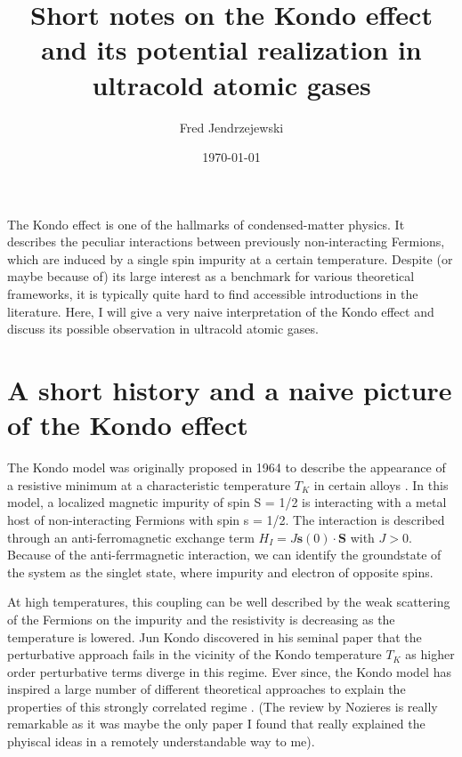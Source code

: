 \documentclass[10pt]{article}
\let\cite\citep
\renewenvironment{abstract}
  {{\bfseries\noindent{\abstractname}\par\nobreak}\footnotesize}
  {\bigskip}
\providecommand\citep{\cite}
\begin{document}
\title{Short notes on the Kondo effect and its potential realization in ultracold atomic gases}



\author[1]{Fred Jendrzejewski}%
%


\vspace{-1em}



  \date{\today}


\begingroup
\let\center\flushleft
\let\endcenter\endflushleft
\maketitle
\endgroup





\begin{abstract}
The Kondo effect is one of the hallmarks of condensed-matter physics. It describes the peculiar interactions between previously non-interacting Fermions, which are induced by a single spin impurity at a certain temperature. Despite (or maybe because of) its large interest as a benchmark for various theoretical frameworks, it is typically quite hard to find accessible introductions in the literature. Here, I will give a very naive interpretation of the Kondo effect and discuss its possible observation in ultracold atomic gases.%
\end{abstract}%



\sloppy


\section{A short history and a naive picture of the Kondo effect}

The Kondo model was originally proposed in 1964 to describe the appearance of a resistive minimum at a characteristic temperature $T_K$ in certain alloys \cite{Kondo_1964}. In this model, a localized magnetic impurity of spin S = 1/2 is interacting with a metal host of non-interacting Fermions with spin s = 1/2. The interaction is described through an anti-ferromagnetic exchange term $H_I = J\mathbf{s}(0)\cdot \mathbf{S}$ with $J > 0$.
Because of the anti-ferrmagnetic interaction, we can identify the groundstate of the system as the singlet state, where impurity and electron of opposite spins.

At high temperatures, this coupling can be well described by the weak scattering of the Fermions on the impurity and the resistivity is decreasing as the temperature is lowered. Jun Kondo discovered in his seminal paper that the perturbative approach fails in the vicinity of the Kondo temperature $T_K$ as higher order perturbative terms diverge in this regime. Ever since, the Kondo model has inspired a large number of different theoretical approaches to explain the properties of this strongly correlated regime \cite{Hewson_1993,nozieres1975,iopscience}. (The review by Nozieres \cite{nozieres1975} is really remarkable as it was maybe the only paper I found that really explained the phyiscal ideas in a remotely understandable way to me).
\end{document}
